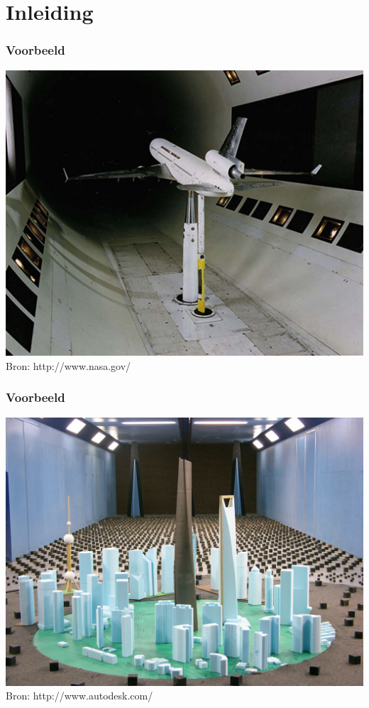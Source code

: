 \documentclass[t]{beamer}
\subtitle{Gelijkvormigheid en dimensieloze getallen}
\begin{document}
	\frame{\titlepage}
	\section{Inleiding}
	\begin{frame}
		\frametitle{Voorbeeld}
		\center
    	\includegraphics[height=0.8\textheight]{../fig/gelijkvormigheid/airplane_in_windtunnel.jpg}\\
		\footnotesize{Bron: http://www.nasa.gov/}
  	\end{frame}
  	\begin{frame}
		\frametitle{Voorbeeld}
		\center
    	\includegraphics[height=0.8\textheight]{../fig/gelijkvormigheid/shanghai_tower_windtunnel.jpg}\\
		\footnotesize{Bron: http://www.autodesk.com/}
  	\end{frame}
\end{document}
